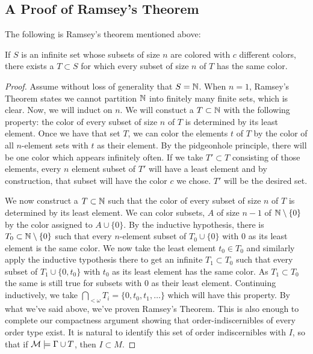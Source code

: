 \subsection{A Proof of Ramsey's Theorem}

The following is Ramsey's theorem mentioned above:

\begin{theorem}\label{theorem_ramseys}
If \(S\) is an infinite set whose subsets of size \(n\) are colored with \(c\) different colors, there exists a \(T \subset S\) for which every subset of size \(n\) of \(T\) has the same color. 
\end{theorem}

\begin{proof}
Assume without loss of generality that \(S = \mathbb{N}\).
When \(n=1\), Ramsey's Theorem states we cannot partition \(\mathbb{N}\) into finitely many finite sets, which is clear.
Now, we will induct on \(n\). 
We will constuct a \(T \subset \mathbb{N}\) with the following property: the color of every subset of size \(n\) of \(T\) is determined by its least element. 
Once we have that set \(T\), we can color the elements \(t\) of \(T\) by the color of all \(n\)-element sets with \(t\) as their element. 
By the pidgeonhole principle, there will be one color which appears infinitely often. 
If we take \(T' \subset T\) consisting of those elements, every \(n\) element subset of \(T'\) will have a least element and by construction, that subset will have the color \(c\) we chose. 
\(T'\) will be the desired set. 

We now construct a \(T \subset \mathbb{N}\) such that the color of every subset of size \(n\) of \(T\) is determined by its least element. 
We can color subsets, \(A\) of size \(n-1\) of \(\mathbb{N} \setminus \{0\}\) by the color assigned to \(A \cup \{0\}\). 
By the inductive hypothesis, there is \(T_0 \subset \mathbb{N} \setminus \{0\}\) such that every \(n\)-element subset of \(T_0 \cup \{0\}\) with 0 as its least element is the same color. 
We now take the least element \(t_0 \in T_0\) and similarly apply the inductive typothesis there to get an infinite \(T_1 \subset T_0\) such that every subset of \(T_1 \cup \{0, t_0\}\) with \(t_0\) as its least element has the same color. 
As \(T_1 \subset T_0\) the same is still true for subsets with \(0\) as their least element. 
Continuing inductively, we take \(\bigcap_{<\omega}T_i = \{0, t_0, t_1, \ldots\}\) which will have this property. 
By what we've said above, we've proven Ramsey's Theorem. 
This is also enough to complete our compactness argument showing that order-indiscernibles of every order type exist.  
It is natural to identify this set of order indiscernibles with \(I\), so that if \(\mathcal{M} \models \Gamma \cup T\), then \(I \subset M\).
\end{proof}

